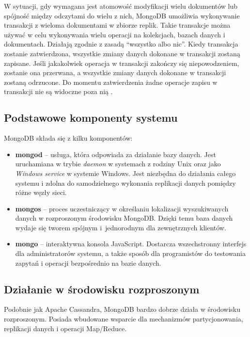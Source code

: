 W sytuacji, gdy wymagana jest atomowość modyfikacji wielu dokumentów lub spójność między odczytami do wielu z nich, MongoDB umożliwia wykonywanie transakcji z wieloma dokumentami w zbiorze replik.
Takie transakcje można używać w celu wykonywania wielu operacji na kolekcjach, bazach danych i dokumentach.
Działają zgodnie z zasadą \enquote{wszystko albo nic}.
Kiedy transakcja zostanie zatwierdzona, wszystkie zmiany danych dokonane w transakcji zostaną zapisane.
Jeśli jakakolwiek operacja w transakcji zakończy się niepowodzeniem, zostanie ona przerwana, a wszystkie zmiany danych dokonane w transakcji zostaną odrzucone.
Do momentu zatwierdzenia żadne operacje zapisu w transakcji nie są widoczne poza nią \cite{MongoDBTransactions}.

\subsection{Podstawowe komponenty systemu}

MongoDB składa się z kilku komponentów:
\begin{itemize}
    \item \textbf{mongod} -- usługa, która odpowiada za działanie bazy danych.
    Jest uruchamiana w trybie \textit{daemon} w systemach z rodziny Unix oraz jako \textit{Windows service} w  systemie Windows.
    Jest niezbędna do działania całego systemu i zdolna do samodzielnego wykonania replikacji danych pomiędzy różne węzły sieci.
    \item \textbf{mongos} -- proces uczestniczący w określaniu lokalizacji wyszukiwanych danych w rozproszonym środowisku MongoDB.
    Dzięki temu baza danych wydaje się tworem spójnym i~jednorodnym dla zewnętrznych klientów.
    \item \textbf{mongo} -- interaktywna konsola JavaScript.
    Dostarcza wszechstronny interfejs dla administratorów systemu, a także sposób dla programistów do testowania zapytań i operacji bezpośrednio na bazie danych.
\end{itemize}

\subsection{Działanie w środowisku rozproszonym}

Podobnie jak Apache Cassandra, MongoDB bardzo dobrze działa w środowisku rozproszonym.
Posiada wbudowane wsparcie dla mechanizmów partycjonowania, replikacji danych i operacji Map/Reduce.

